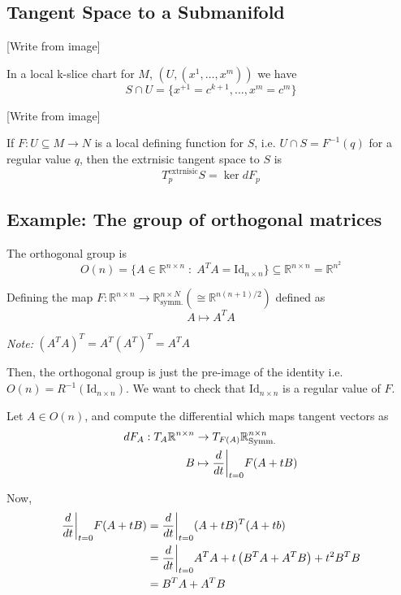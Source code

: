 \documentclass{article}
\newcommand{\R}{\mathbb{R}}
\newcommand{\restr}[2]{{%
  \left.\kern-\nulldelimiterspace %
  #1 %
  \vphantom{\big|} %
  \right|_{#2} %
  }}
\begin{document}
\vskip 1cm
\subsection{Tangent Space to a Submanifold}
[Write from image]

\vskip 0.5cm
In a local k-slice chart for $M$, $\left( U, \left( x^1, \dots, x^m \right) \right) $ we have 
\[ S \cap U = \{x^{+1} = c^{k+1}, \dots, x^m = c^{m}\} \]

[Write from image]

\vskip 0.5cm
If $F : U \subseteq M \rightarrow N$ is a local defining function for $S$, i.e. $U \cap S = F^{-1}(q)$ for a regular value $q$, then the extrnisic tangent space to $S$ is 
\[ T_{p}^{\text{extrnisic}} S = \ker dF_p \]

\vskip 1cm
\subsection*{Example: The group of orthogonal matrices}

\vskip 0.5cm
The orthogonal group is 
\[ O(n) = \{ A \in \R^{n \times n} \;:\; A^{T} A = \text{Id}_{n \times n} \} \subseteq \R^{n \times n} = \R^{{n^2}} \]

Defining the map $F : \R^{n \times n} \rightarrow \R^{n \times N}_{\text{symm.}} \left(\cong \R^{n(n+1)/2}\right)$ defined as 
\[ A \mapsto A^T A \]

\begin{dottedbox}
  \emph{Note:} $\left(A^T A\right)^T = A^T \left(A^T\right)^T = A^T A$
\end{dottedbox}

\vskip 0.5cm
Then, the orthogonal group is just the pre-image of the identity i.e. $O(n) = R^{-1}\left(\text{Id}_{n \times n}\right)$. We want to check that $\text{Id}_{n \times n}$ is a regular value of $F$.

\vskip 0.5cm
Let $A \in O(n)$, and compute the differential which maps tangent vectors as
\begin{align*}
  dF_{A} : T_A \R^{n \times n} &\rightarrow T_{F(A)} \R^{n \times n}_{\text{Symm.}} \\
  B &\mapsto \restr{\frac{d}{dt}}{t = 0} F(A + tB)
\end{align*}

Now, 
\begin{align*}
  \restr{\frac{d}{dt}}{t = 0} F(A + tB) &= \restr{\frac{d}{dt}}{t = 0} (A + tB)^T (A + tb) \\
  &= \restr{\frac{d}{dt}}{t = 0} A^T A + t\left( B^T A + A^T B \right) + t^2 B^T B \\
  &= B^T A + A^T B
\end{align*}
\end{document}
